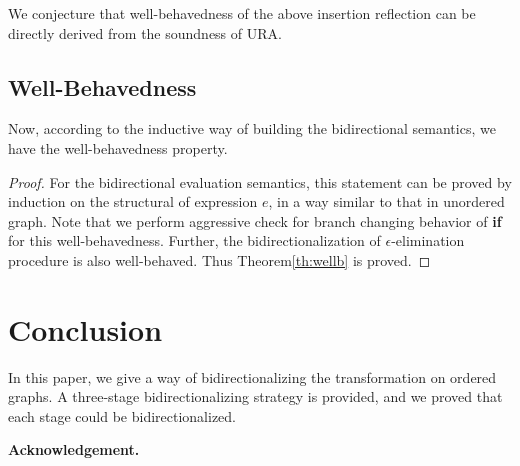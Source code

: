 \documentclass{llncs}
\begin{document}
We conjecture that well-behavedness of the above insertion reflection can be directly derived from the soundness of URA.

\subsection{Well-Behavedness}

Now, according to the inductive way of building the bidirectional semantics, we have the well-behavedness property.

\begin{proof}
For the bidirectional evaluation semantics, this statement can be proved by induction on the structural of expression $e$, in a way similar to that in unordered graph. Note that we perform aggressive check for branch changing behavior of \textbf{if} for this well-behavedness. Further, the bidirectionalization of $\epsilon$-elimination procedure is also well-behaved. Thus Theorem\ref{th:wellb} is proved.
\end{proof}

\section{Conclusion}\label{sec:con}

In this paper, we give a way of bidirectionalizing the transformation on ordered graphs. A three-stage bidirectionalizing strategy is provided, and we proved that each stage could be bidirectionalized. 

\vspace*{4mm}
\noindent\textbf{Acknowledgement.}



\end{document}
